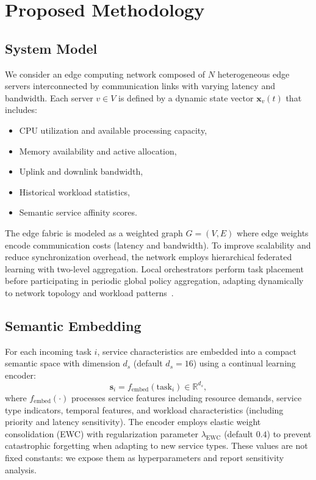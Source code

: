 \documentclass[conference]{IEEEtran}
\begin{document}
		
		\section{Proposed Methodology}
		\label{sec:methodology}
		
		\subsection{System Model}
		We consider an edge computing network composed of $N$ heterogeneous edge servers interconnected by communication links with varying latency and bandwidth. Each server $v \in V$ is defined by a dynamic state vector $\mathbf{x}_v(t)$ that includes:
		\begin{itemize}
			\item CPU utilization and available processing capacity,
			\item Memory availability and active allocation,
			\item Uplink and downlink bandwidth,
			\item Historical workload statistics,
			\item Semantic service affinity scores.
		\end{itemize}
		
		The edge fabric is modeled as a weighted graph $G = (V, E)$ where edge weights encode communication costs (latency and bandwidth). To improve scalability and reduce synchronization overhead, the network employs hierarchical federated learning with two-level aggregation. Local orchestrators perform task placement before participating in periodic global policy aggregation, adapting dynamically to network topology and workload patterns~\cite{zhou2024qos, yurdem2024federated, zhou2024robustfl}.
		
		\subsection{Semantic Embedding}
		For each incoming task $i$, service characteristics are embedded into a compact semantic space with dimension $d_s$ (default $d_s=16$) using a continual learning encoder:
		\begin{equation}
			\mathbf{s}_i = f_{\text{embed}}(\text{task}_i) \in \mathbb{R}^{d_s},
		\end{equation}
		where $f_{\text{embed}}(\cdot)$ processes service features including resource demands, service type indicators, temporal features, and workload characteristics (including priority and latency sensitivity). The encoder employs elastic weight consolidation (EWC) with regularization parameter $\lambda_{\text{EWC}}$ (default $0.4$) to prevent catastrophic forgetting when adapting to new service types. These values are not fixed constants: we expose them as hyperparameters and report sensitivity analysis.
		
\end{document}
